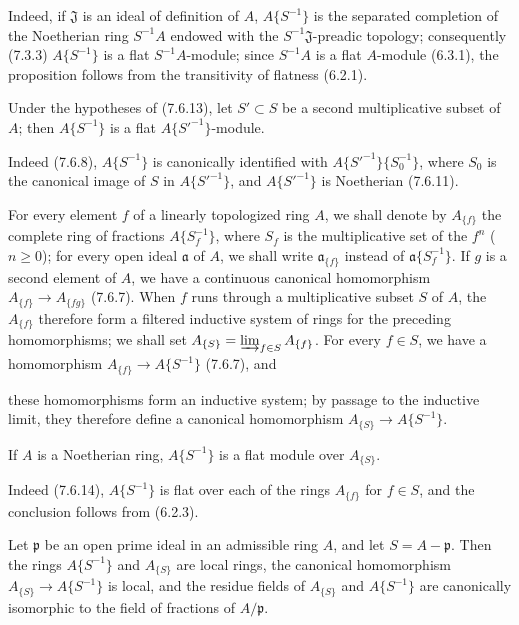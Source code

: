 Indeed, if $\mathfrak J$ is an ideal of definition of $A$,
$A\{S^{-1}\}$ is the separated completion of the Noetherian ring $S^{-1}A$ endowed
with the $S^{-1}\mathfrak J$-preadic topology; consequently (7.3.3)
$A\{S^{-1}\}$ is a flat $S^{-1}A$-module; since $S^{-1}A$ is a
flat $A$-module (6.3.1), the proposition follows from the transitivity of
flatness (6.2.1).

\begin{corollary}[7.6.14]
\label{0.7.6.14}
Under the hypotheses of (7.6.13), let $S'\subset S$ be a second multiplicative
subset of $A$; then $A\{S^{-1}\}$ is a flat
$A\{{S'}^{-1}\}$-module.
\end{corollary}

Indeed (7.6.8), $A\{S^{-1}\}$ is canonically identified with
$A\{{S'}^{-1}\}\{S_0^{-1}\}$, where $S_0$ is the canonical image of $S$ in
$A\{{S'}^{-1}\}$, and $A\{{S'}^{-1}\}$ is Noetherian (7.6.11).

\begin{env}[7.6.15]
\label{0.7.6.15}
For every element $f$ of a linearly topologized ring $A$, we shall
denote by $A_{\{f\}}$ the complete ring of fractions $A\{S_f^{-1}\}$,
where $S_f$ is the multiplicative set of the $f^n$ ($n\geq 0$); for every
open ideal $\mathfrak a$ of $A$, we shall write $\mathfrak a_{\{f\}}$ instead
of $\mathfrak a\{S_f^{-1}\}$. If $g$ is a second element of $A$, we have
a continuous canonical homomorphism $A_{\{f\}}\to A_{\{fg\}}$ (7.6.7).
When $f$ runs through a multiplicative subset $S$ of $A$, the $A_{\{f\}}$
therefore form a filtered inductive system of rings for the preceding
homomorphisms; we shall set
$A_{\{S\}}=\varinjlim_{f\in S}A_{\{f\}}$. For every $f\in S$, we have a
homomorphism $A_{\{f\}}\to A\{S^{-1}\}$ (7.6.7), and


these homomorphisms form an inductive system; by passage to the inductive
limit, they therefore define a canonical homomorphism
$A_{\{S\}}\to A\{S^{-1}\}$.
\end{env}

\begin{proposition}[7.6.16]
\label{0.7.6.16}
If $A$ is a Noetherian ring, $A\{S^{-1}\}$ is a flat module over
$A_{\{S\}}$.
\end{proposition}

Indeed (7.6.14), $A\{S^{-1}\}$ is flat over each of the rings
$A_{\{f\}}$ for $f\in S$, and the conclusion follows from (6.2.3).

\begin{proposition}[7.6.17]
\label{0.7.6.17}
Let $\mathfrak p$ be an open prime ideal in an admissible ring $A$, and
let $S=A-\mathfrak p$. Then the rings $A\{S^{-1}\}$ and $A_{\{S\}}$ are
local rings, the canonical homomorphism
$A_{\{S\}}\to A\{S^{-1}\}$ is local, and the residue fields of $A_{\{S\}}$
and $A\{S^{-1}\}$ are canonically isomorphic to the field of fractions of
$A/\mathfrak p$.
\end{proposition}

